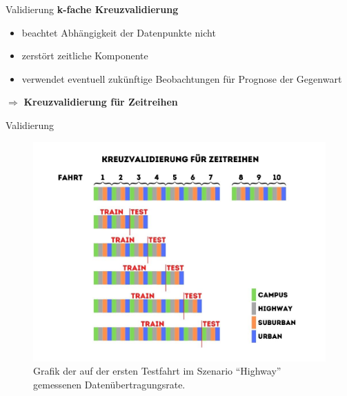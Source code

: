 \begin{frame}{Validierung}
	\textbf{k-fache Kreuzvalidierung}
	\begin{itemize}
		\item beachtet Abhängigkeit der Datenpunkte nicht
		\item zerstört zeitliche Komponente
		\item verwendet eventuell zukünftige Beobachtungen für Prognose der Gegenwart
	\end{itemize}
	$\Rightarrow$ \textbf{Kreuzvalidierung für Zeitreihen}
\end{frame}
	
\begin{frame}{Validierung}
	\begin{figure}[h]
		\centering
		\includegraphics[scale=0.3]{kreuzvalidierung}
		\caption{Grafik der auf der ersten Testfahrt im Szenario ``Highway'' gemessenen Datenübertragungsrate.}
		\label{kreuzvalidierung}
	\end{figure}
\end{frame}
	


